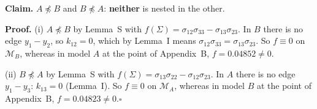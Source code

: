\documentclass[10pt,a4paper]{article}
\newcommand{\nnest}{\not\preceq}
\begin{document}
\par\bigskip
\noindent\textbf{Claim.} $A \nnest B$ and $B \nnest A$: \textbf{neither} is nested in the other.\par\smallskip
\noindent\textbf{Proof.} (i) $A\nnest B$ by Lemma~S with $f(\Sigma)=\sigma_{12}\sigma_{33} - \sigma_{13}\sigma_{23}$. In $B$ there is no edge $y_1-y_2$, so $k_{12}=0$, which by Lemma~I means $\sigma_{12}\sigma_{33}=\sigma_{13}\sigma_{23}$. So $f\equiv0$ on $\mathcal M_B$, whereas in model $A$ at the point of Appendix~B, $f=0.04852\neq0$.\par\smallskip
\noindent(ii) $B\nnest A$ by Lemma~S with $f(\Sigma)=\sigma_{13}\sigma_{22} - \sigma_{12}\sigma_{23}$. In $A$ there is no edge $y_1-y_3$: $k_{13}=0$ (Lemma~I). So $f\equiv0$ on $\mathcal M_A$, whereas in model $B$ at the point of Appendix~B, $f=0.04823\neq0$.\hfill$\square$\par\medskip
{}

\clearpage
\end{document}
